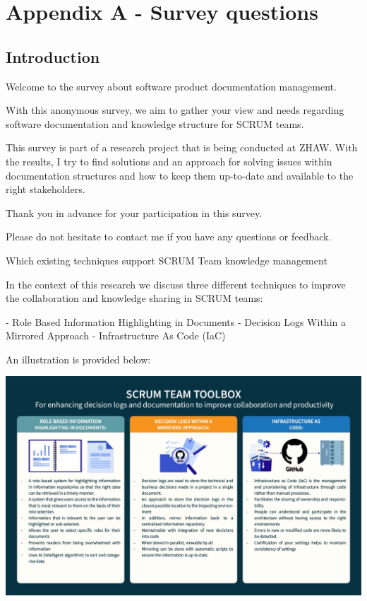 

\section*{Appendix A - Survey questions}

\subsection*{Introduction}

Welcome to the survey about software product documentation management.

With this anonymous survey, we aim to gather your view and needs regarding software documentation and knowledge structure for SCRUM teams.

This survey is part of a research project that is being conducted at ZHAW. With the results, I try to find solutions and an approach for solving issues within documentation structures and how to keep them up-to-date and available to the right stakeholders.

Thank you in advance for your participation in this survey.

Please do not hesitate to contact me if you have any questions or feedback.

Which existing techniques support SCRUM Team knowledge management

In the context of this research we discuss three different techniques to improve the collaboration and knowledge sharing in SCRUM teams:

- Role Based Information Highlighting in Documents
- Decision Logs Within a Mirrored Approach
- Infrastructure As Code (IaC)

An illustration is provided below:

\includegraphics[scale=0.5]{Images/toolbox.jpg}

